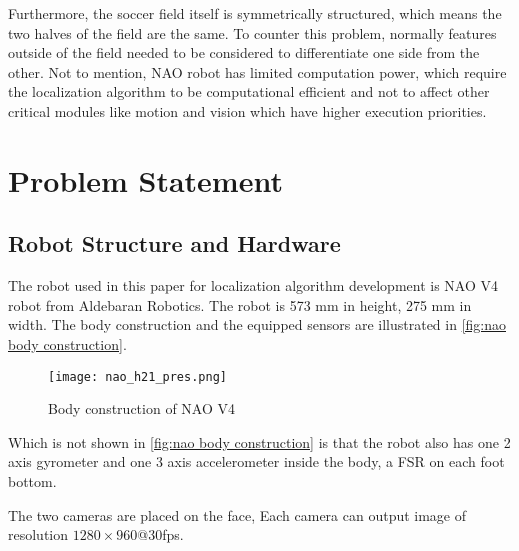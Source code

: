 Furthermore, the soccer field itself is symmetrically structured, which means the two halves of the field are the same. To counter this problem, normally features outside of the field needed to be considered to differentiate one side from the other.
Not to mention,  NAO robot has limited computation power, which require the localization algorithm to be computational efficient and not to affect other critical modules like motion and vision which have higher execution priorities.




\section{Problem Statement}
\subsection{Robot Structure and Hardware}
The robot used in this paper for localization algorithm development is NAO V4 robot from Aldebaran Robotics{\textregistered}. The robot is 573 mm in height, 275 mm in width. The body construction and the equipped sensors are illustrated in \autoref{fig:nao body construction}.

\begin{figure}[h!]
  \centering
  \texttt{[image: nao\_h21\_pres.png]}
  \caption{Body construction of NAO V4}
  \label{fig:nao body construction}
\end{figure}

Which is not shown in \autoref{fig:nao body construction} is that the robot also has one 2 axis gyrometer and one 3 axis accelerometer inside the body, a \gls{FSR} on each foot bottom. 

The two cameras are placed on the face, Each camera can output image of resolution $1280 \times 960$@30fps. %


